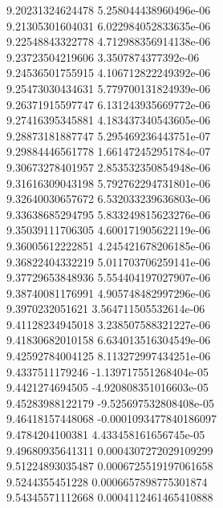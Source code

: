{9.20231324624478 5.258044438960496e-06 \\
9.21305301604031 6.022984052833635e-06 \\
9.22548843322778 4.712988356914138e-06 \\
9.23723504219606 3.3507874377392e-06 \\
9.24536501755915 4.106712822249392e-06 \\
9.25473030434631 5.779700131824939e-06 \\
9.26371915597747 6.131243935669772e-06 \\
9.27416395345881 4.183437340543605e-06 \\
9.28873181887747 5.295469236443751e-07 \\
9.29884446561778 1.661472452951784e-07 \\
9.30673278401957 2.853532350854948e-06 \\
9.31616309043198 5.792762294731801e-06 \\
9.32640030657672 6.532033239636803e-06 \\
9.33638685294795 5.833249815623276e-06 \\
9.35039111706305 4.600171905622119e-06 \\
9.36005612222851 4.245421678206185e-06 \\
9.36822404332219 5.011703706259141e-06 \\
9.37729653848936 5.554404197027907e-06 \\
9.38740081176991 4.905748482997296e-06 \\
9.3970232051621 3.564711505532614e-06 \\
9.41128234945018 3.238507588321227e-06 \\
9.41830682010158 6.634013516304549e-06 \\
9.42592784004125 8.113272997434251e-06 \\
9.4337511179246 -1.139717551268404e-05 \\
9.4421274694505 -4.920808351016603e-05 \\
9.45283988122179 -9.525697532808408e-05 \\
9.46418157448068 -0.0001093477840186097 \\
9.4784204100381 4.433458161656745e-05 \\
9.49680935641311 0.0004307272029109299 \\
9.51224893035487 0.0006725519197061658 \\
9.5244355451228 0.0006657898775301874 \\
9.54345571112668 0.0004112461465410888 \\
}
